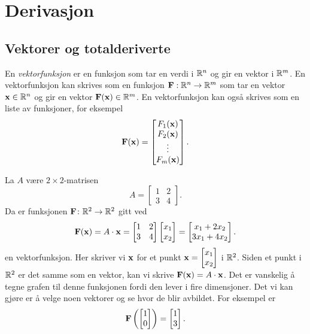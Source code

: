 \section{Derivasjon}
\subsection{Vektorer og totalderiverte}
En {\em vektorfunksjon} er en funksjon som tar en verdi i $\mathbb{R}^n$ og gir en
vektor i $\mathbb{R}^m$. En vektorfunksjon kan skrives som en funksjon
$\mathbf{F}:\mathbb{R}^n\to\mathbb{R}^m$ som tar en vektor $\mathbf{x}\in\mathbb{R}^n$ og gir en vektor
$\mathbf{F}(\mathbf{x})\in\mathbb{R}^m$. En vektorfunksjon kan også skrives som en liste av
funksjoner, for eksempel
$$\mathbf{F}(\mathbf{x}) = \begin{bmatrix} F_1(\mathbf{x}) \\ F_2(\mathbf{x}) \\ \vdots \\ F_m(\mathbf{x}) \end{bmatrix}.$$

\begin{eksempel}\label{lineærfunksjon}
  La $A$ være $2 \times 2$-matrisen
  $$A = \begin{bmatrix} 1 & 2 \\ 3 & 4 \end{bmatrix}.$$
  Da er funksjonen $\mathbf{F} \colon \mathbb{R}^2 \to \mathbb{R}^2$ gitt ved
  $$\mathbf{F}(\mathbf{x}) = A \cdot \mathbf{x} = \begin{bmatrix} 1 & 2 \\ 3 & 4 \end{bmatrix}
  \begin{bmatrix} x_1 \\ x_2 \end{bmatrix} = \begin{bmatrix} x_1 + 2x_2 \\ 3x_1
  + 4x_2 \end{bmatrix}.$$
  en vektorfunksjon.
  Her skriver vi $\mathbf{x}$ for et punkt $\mathbf{x} = \begin{bmatrix} x_1 \\ x_2 \end{bmatrix}$ i $\mathbb{R}^2$. 
  Siden et punkt i $\mathbb{R}^2$ er det samme som en vektor, kan vi skrive $\mathbf{F}(\mathbf{x}) = A \cdot \mathbf{x}$.
  Det er vanskelig å tegne grafen til denne funksjonen fordi den lever i fire dimensjoner. Det vi kan gjøre
  er å velge noen vektorer og se hvor de blir avbildet. For eksempel er
  $$\mathbf{F}\left(\begin{bmatrix} 1 \\ 0 \end{bmatrix}\right) = \begin{bmatrix} 1 \\ 3 \end{bmatrix}.$$
\end{eksempel}

